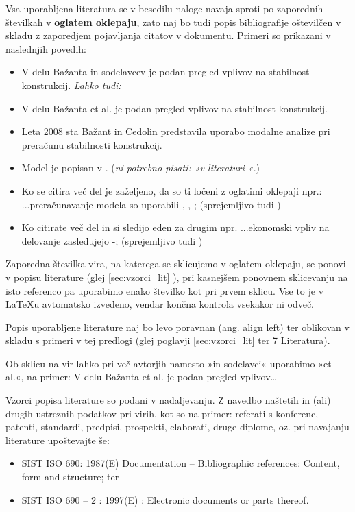 Vsa uporabljena literatura se v besedilu naloge navaja sproti po zaporednih 
številkah v \textbf{oglatem oklepaju}, zato naj bo tudi popis bibliografije 
oštevilčen v skladu z zaporedjem pojavljanja citatov v dokumentu. Primeri so 
prikazani v naslednjih povedih:
\begin{itemize}
	\item V delu Bažanta in sodelavcev \cite{bazant_1991} je podan pregled 
	vplivov na stabilnost konstrukcij. \emph{Lahko tudi:}
	\item V delu Bažanta et al. \cite{bazant_1991} je podan pregled vplivov na 
	stabilnost konstrukcij.
	\item Leta 2008 sta Bažant in Cedolin \cite{Bazant_2008} predstavila 
	uporabo modalne analize pri pre\-ra\-ču\-nu stabilnosti konstrukcij.
	\item Model je popisan v \cite{Doe_1991}. (\emph{ni potrebno pisati: »v 
		literaturi \cite{Doe_1991}«}.)
	\item Ko se citira več del je zaželjeno, da so ti ločeni z oglatimi 
	oklepaji npr.:  ...preračunavanje modela so uporabili \cite{bazant_1991}, 
	\cite{Doe_1991}, \cite{Bazant_2008}; (sprejemljivo tudi 
	\cite{bazant_1991,Doe_1991,Bazant_2008}) 
	\item Ko citirate več del in si sledijo eden za drugim npr. ...ekonomski 
	vpliv na delovanje zasledujejo \cite{bazant_1991}-\cite{Bazant_2008}; 
	(sprejemljivo tudi \cite{bazant_1991, stropnik_1997, 
		Doe_1991,Loukides_2020, Bazant_2008})
\end{itemize}

Zaporedna številka vira, na katerega se sklicujemo v oglatem oklepaju, se 
ponovi v popisu literature (glej \ref{sec:vzorci_lit} 
), pri kasnejšem ponovnem sklicevanju na isto referenco 
pa uporabimo enako številko kot pri prvem sklicu. Vse to je v \LaTeX u 
avtomatsko izvedeno, vendar končna kontrola vsekakor ni odveč.

Popis uporabljene literature naj bo levo poravnan (ang. align left) ter 
oblikovan v skladu s primeri v tej predlogi (glej poglavji \ref{sec:vzorci_lit} 
 ter 7 Literatura).

Ob sklicu na vir lahko pri več avtorjih namesto »in sodelavci« uporabimo »et 
al.«, na primer: V delu Bažanta et al. \cite{bazant_1991} je podan pregled 
vplivov\ldots

Vzorci popisa literature so podani v nadaljevanju. Z navedbo naštetih in (ali) 
drugih ustreznih podatkov pri virih, kot so na primer: referati s konferenc, 
patenti, standardi, predpisi, prospekti, elaborati, druge diplome, oz. pri 
navajanju literature upoštevajte še:
\begin{itemize}
	\item SIST ISO 690: 1987(E) Documentation – Bibliographic references: 
	Content, form and structure; ter
	\item SIST ISO 690 – 2 : 1997(E) : Electronic documents or parts thereof.
\end{itemize}


